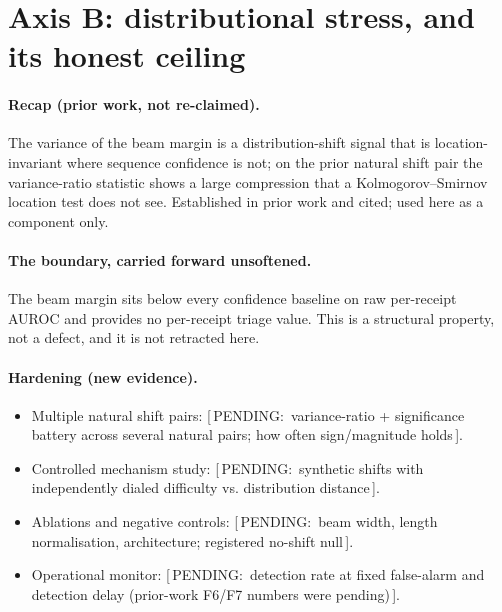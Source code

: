 \documentclass[10pt,twocolumn,a4paper]{article}
\newcommand{\priorfact}[1]{#1}
\newcommand{\pending}[1]{{\small\sffamily\color{pendingclr}[\,PENDING:\ #1\,]}}
\begin{document}
\section{Axis B: distributional stress, and its honest ceiling}
\label{sec:axisB}
\paragraph{Recap (prior work, not re-claimed).}
\priorfact{The variance of the beam margin is a distribution-shift signal
that is location-invariant where sequence confidence is not; on the prior
natural shift pair the variance-ratio statistic shows a large compression
that a Kolmogorov--Smirnov location test does not see.}
Established in prior work and cited; used here as a component only.
\paragraph{The boundary, carried forward unsoftened.}
\priorfact{The beam margin sits below every confidence baseline on raw
per-receipt AUROC and provides no per-receipt triage value. This is a
structural property, not a defect, and it is not retracted here.}
\paragraph{Hardening (new evidence).}
\begin{itemize}
  \item Multiple natural shift pairs: \pending{variance-ratio + significance battery across several natural pairs; how often sign/magnitude holds}.
  \item Controlled mechanism study: \pending{synthetic shifts with independently dialed difficulty vs. distribution distance}.
  \item Ablations and negative controls: \pending{beam width, length normalisation, architecture; registered no-shift null}.
  \item Operational monitor: \pending{detection rate at fixed false-alarm and detection delay (prior-work F6/F7 numbers were pending)}.
\end{itemize}
\end{document}
